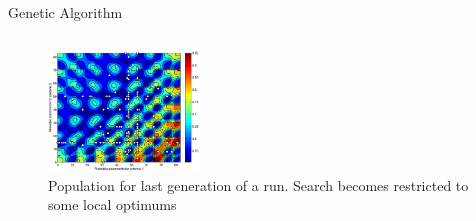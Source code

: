 \documentclass{beamer}
\begin{document}
\begin{frame}{Genetic Algorithm}
\begin{columns}
\begin{column}{0.3\linewidth}
{\begin{figure}
                    \centerline{\includegraphics[width=4cm]{../paper/FIG/tc1_ga_anim}}
                    \caption*{\tiny Population for last generation of a run. Search becomes restricted to some local optimums}
                \end{figure}
            }
        \end{column}
    \end{columns}
\end{frame}
\end{document}
